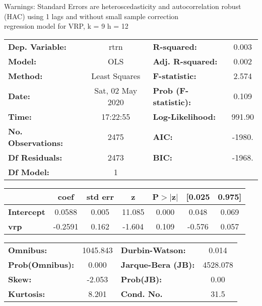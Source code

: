 Warnings: \newline
 [1] Standard Errors are heteroscedasticity and autocorrelation robust (HAC) using 1 lags and without small sample correction\\ 

regression model for VRP, k = 9 h = 12\begin{center}
\begin{tabular}{lclc}
\toprule
\textbf{Dep. Variable:}    &       rtrn       & \textbf{  R-squared:         } &     0.003   \\
\textbf{Model:}            &       OLS        & \textbf{  Adj. R-squared:    } &     0.002   \\
\textbf{Method:}           &  Least Squares   & \textbf{  F-statistic:       } &     2.574   \\
\textbf{Date:}             & Sat, 02 May 2020 & \textbf{  Prob (F-statistic):} &    0.109    \\
\textbf{Time:}             &     17:22:55     & \textbf{  Log-Likelihood:    } &    991.90   \\
\textbf{No. Observations:} &        2475      & \textbf{  AIC:               } &    -1980.   \\
\textbf{Df Residuals:}     &        2473      & \textbf{  BIC:               } &    -1968.   \\
\textbf{Df Model:}         &           1      & \textbf{                     } &             \\
\bottomrule
\end{tabular}
\begin{tabular}{lcccccc}
                   & \textbf{coef} & \textbf{std err} & \textbf{z} & \textbf{P$> |$z$|$} & \textbf{[0.025} & \textbf{0.975]}  \\
\midrule
\textbf{Intercept} &       0.0588  &        0.005     &    11.085  &         0.000        &        0.048    &        0.069     \\
\textbf{vrp}       &      -0.2591  &        0.162     &    -1.604  &         0.109        &       -0.576    &        0.057     \\
\bottomrule
\end{tabular}
\begin{tabular}{lclc}
\textbf{Omnibus:}       & 1045.843 & \textbf{  Durbin-Watson:     } &    0.014  \\
\textbf{Prob(Omnibus):} &   0.000  & \textbf{  Jarque-Bera (JB):  } & 4528.078  \\
\textbf{Skew:}          &  -2.053  & \textbf{  Prob(JB):          } &     0.00  \\
\textbf{Kurtosis:}      &   8.201  & \textbf{  Cond. No.          } &     31.5  \\
\bottomrule
\end{tabular}
\end{center}

